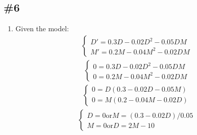\documentclass[12pt]{article}
\begin{document}
\subsection*{\#6}
\begin{enumerate}[label=\alph*.] 
    \item Given the model:
\begin{align*}
    \begin{cases}
    D' = 0.3D - 0.02D^2 - 0.05DM \\
    M' = 0.2M - 0.04M^2 - 0.02DM
    \end{cases}
\end{align*}
\begin{align*}
    \begin{cases}
    0 = 0.3D - 0.02D^2 - 0.05DM \\
    0 = 0.2M - 0.04M^2 - 0.02DM
    \end{cases}
\end{align*}
\begin{align*}
    \begin{cases}
    0 = D(0.3 - 0.02D - 0.05M) \\
    0 = M(0.2 - 0.04M - 0.02D)
    \end{cases}
\end{align*}
\begin{align*}
    \begin{cases}
    D = 0 \text{or} M = (0.3 - 0.02D) / 0.05 \\
    M = 0 \text{or} D = 2M - 10
    \end{cases}
\end{align*}


\end{enumerate}
\end{document}
